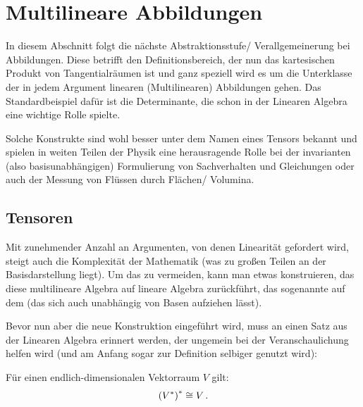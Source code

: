 \documentclass[../H_Analysis_main.tex]{subfiles}
\begin{document}
\setcounter{chapter}{4}

\chapter{Multilineare Abbildungen}
\begin{center}
In diesem Abschnitt folgt die nächste Abstraktionsstufe/ Verallgemeinerung bei Abbildungen. Diese betrifft den Definitionsbereich, der nun das kartesischen Produkt von Tangentialräumen ist und ganz speziell wird es um die Unterklasse der in jedem Argument linearen (Multilinearen) Abbildungen gehen. Das Standardbeispiel dafür ist die Determinante, die schon in der Linearen Algebra eine wichtige Rolle spielte.

Solche Konstrukte sind wohl besser unter dem Namen eines Tensors bekannt und spielen in weiten Teilen der Physik eine herausragende Rolle bei der invarianten (also basisunabhängigen) Formulierung von Sachverhalten und Gleichungen oder auch der Messung von Flüssen durch Flächen/ Volumina.
\end{center}


\newpage


	\section{Tensoren}
Mit zunehmender Anzahl an Argumenten, von denen Linearität gefordert wird, steigt auch die Komplexität der Mathematik (was zu großen Teilen an der Basisdarstellung liegt). Um das zu vermeiden, kann man etwas konstruieren, das diese multilineare Algebra auf lineare Algebra zurückführt, das sogenannte  auf dem  (das sich auch unabhängig von Basen aufziehen lässt).



Bevor nun aber die neue Konstruktion eingeführt wird, muss an einen Satz aus der Linearen Algebra erinnert werden, der ungemein bei der Veranschaulichung helfen wird (und am Anfang sogar zur Definition selbiger genutzt wird):
\begin{satz}[Dualität]\label{satz:dualitaet}
Für einen endlich-dimensionalen Vektorraum $V$ gilt:
\begin{equation}
\qty(V^*)^* \cong V \, .
\end{equation}
\end{satz}
\end{document}
